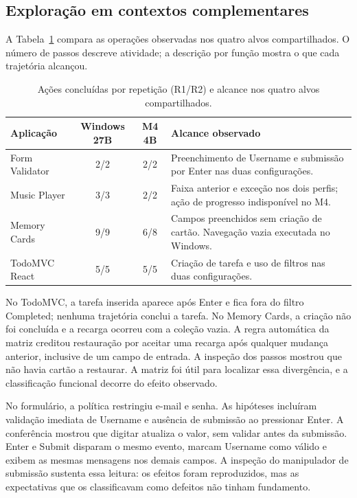 \documentclass[12pt]{article}
\begin{document}
\subsection{Exploração em contextos complementares}
A Tabela~\ref{tab:diverse} compara as operações observadas nos quatro alvos compartilhados. O número de passos descreve atividade; a descrição por função mostra o que cada trajetória alcançou.

\begin{table}[ht]
\centering\small
\caption{Ações concluídas por repetição (R1/R2) e alcance nos quatro alvos compartilhados.}
\label{tab:diverse}
\begin{tabular}{lcc>{\raggedright\arraybackslash}p{6.6cm}}
\toprule
Aplicação & Windows 27B & M4 4B & Alcance observado\\
\midrule
Form Validator & 2/2 & 2/2 & Preenchimento de Username e submissão por Enter nas duas configurações.\\
Music Player & 3/3 & 2/2 & Faixa anterior e exceção nos dois perfis; ação de progresso indisponível no M4.\\
Memory Cards & 9/9 & 6/8 & Campos preenchidos sem criação de cartão. Navegação vazia executada no Windows.\\
TodoMVC React & 5/5 & 5/5 & Criação de tarefa e uso de filtros nas duas configurações.\\
\bottomrule
\end{tabular}
\end{table}

No TodoMVC, a tarefa inserida aparece após Enter e fica fora do filtro Completed; nenhuma trajetória conclui a tarefa. No Memory Cards, a criação não foi concluída e a recarga ocorreu com a coleção vazia. A regra automática da matriz creditou restauração por aceitar uma recarga após qualquer mudança anterior, inclusive de um campo de entrada. A inspeção dos passos mostrou que não havia cartão a restaurar. A matriz foi útil para localizar essa divergência, e a classificação funcional decorre do efeito observado.

No formulário, a política restringiu e-mail e senha. As hipóteses incluíram validação imediata de Username e ausência de submissão ao pressionar Enter. A conferência mostrou que digitar atualiza o valor, sem validar antes da submissão. Enter e Submit disparam o mesmo evento, marcam Username como válido e exibem as mesmas mensagens nos demais campos. A inspeção do manipulador de submissão sustenta essa leitura: os efeitos foram reproduzidos, mas as expectativas que os classificavam como defeitos não tinham fundamento.
\end{document}
